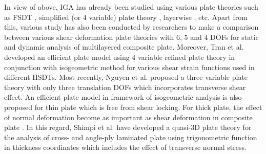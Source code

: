\documentclass[3p,preprint,12pt]{elsarticle}
\begin{document}
In view of above, IGA has already been studied using various plate theories such as FSDT \cite{da2012isogeometric}, simplified (or 4 variable) plate theory \cite{nguyen2014isogeometric,tran2014isogeometric}, layerwise \cite{guo2014layerwise,thai2013isogeometric}, etc. Apart from this, various study has also been conducted by researchers \cite{kant2002analytical, shimpi2006two, thai2010free} to make a comparison between various shear deformation plate theories with 6, 5 and 4 DOFs for static and dynamic analysis of multilayered composite plate. Moreover, Tran  et al. \cite{tran2014isogeometric} developed an efficient plate model using 4 variable refined plate theory in conjunction with isogeometric method for various shear strain functions used in different HSDTs. %
Most recently, Nguyen et al. \cite{nguyen2017novel} proposed a three variable plate theory with only three translation DOFs which incorporates transverse shear effect. An efficient plate model in framework of isogeometric analysis is also proposed for thin plate which is free from shear locking. For thick plate, the effect of normal deformation become as important as shear deformation in composite plate \cite{nguyen2016general}. %
In this regard, Shimpi et al. \cite{shimpi2003higher} have developed a quasi-3D plate theory for the analysis of cross- and angle-ply laminated plate using trigonometric function in thickness coordinates which includes the effect of transverse normal stress. %
\end{document}
